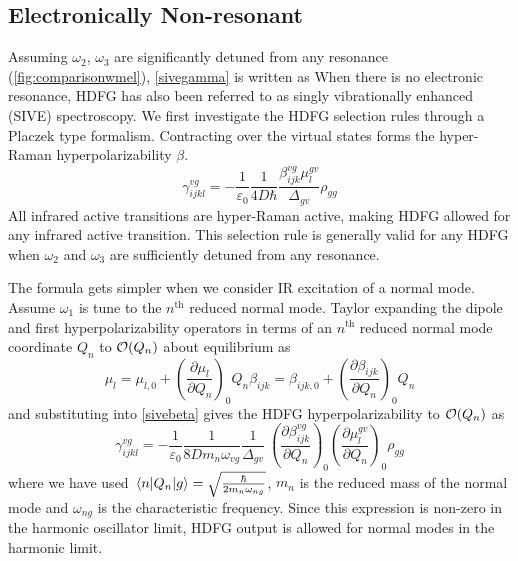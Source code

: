 \documentclass[aip, jcp, reprint, onecolumn]{revtex4-2}
\begin{document}
\subsection{Electronically Non-resonant}
Assuming $\omega_2$, $\omega_3$ are significantly detuned from any resonance (\autoref{fig:comparisonwmel}),\cite{Placzek1934, Long1970, Altmann1982} \autoref{sivegamma} is written as 
When there is no electronic resonance, HDFG has also been referred to as singly vibrationally enhanced (SIVE) spectroscopy. \cite{RN352}
We first investigate the HDFG selection rules through a Placzek type formalism.
Contracting over the virtual states forms the hyper-Raman hyperpolarizability $\beta$.\cite{Long1970} 
\begin{equation}\label{sivebeta}
	\gamma_{ijkl}^{vg} =	-\frac{1}{\varepsilon_0} \frac{1}{4D \hbar}\frac{\beta^{vg}_{ijk} \mu^{gv}_{l}}{\Delta_{gv}} \rho_{gg}
\end{equation}
All infrared active transitions are hyper-Raman active, making HDFG allowed for any infrared active transition. \cite{Andrews1978}
This selection rule is generally valid for any HDFG when $\omega_2$ and $\omega_3$ are sufficiently detuned from any resonance.

The formula gets simpler when we consider IR excitation of a normal mode.  
Assume $\omega_1$ is tune to the $n^{\text{th}}$ reduced normal mode.
Taylor expanding the dipole and first hyperpolarizability operators in terms of an $n^{\text{th}}$ reduced normal mode coordinate $Q_n$ to $\order{Q_n}$ about equilibrium as\cite{Long1970, Shen90}
\begin{subequations}
	\begin{equation}
		\mu_l = \mu_{l,0} + \left(\frac{\partial \mu_l}{\partial Q_n}\right)_0 Q_n 
	\end{equation}
	\begin{equation}
		\beta_{ijk} = \beta_{ijk,0} + \left(\frac{\partial \beta_{ijk}}{\partial Q_n}\right)_0 Q_n
	\end{equation}
\end{subequations}
and substituting into \autoref{sivebeta} gives the HDFG hyperpolarizability to $\order{Q_n}$ as \begin{equation}\label{SIVEselection}
	\gamma_{ijkl}^{vg} =	-\frac{1}{\varepsilon_0} \frac{1}{8D m_n \omega_{vg}}  \frac{1}{{\Delta_{gv}}} \ \left(\frac{\partial \beta^{vg}_{ijk}}{\partial Q_n}\right)_0 \left({\frac{\partial \mu^{gv}_{l}}{\partial Q_n}}\right)_0  \rho_{gg}
\end{equation}
where we have used $\mel{n}{Q_n}{g} = \sqrt{\frac{\hbar}{2m_n\omega_{ng}}}$, $m_n$ is the reduced mass of the normal mode and $\omega_{ng}$ is the characteristic frequency.\cite{RN230}
Since this expression is non-zero in the harmonic oscillator limit, HDFG output is allowed for normal modes in the harmonic limit. 
\end{document}
